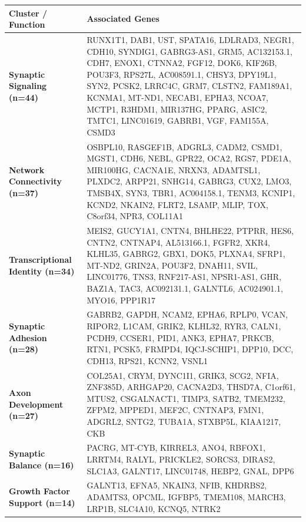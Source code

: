 \begin{longtable}{p{} p{}}
\hline
\textbf{Cluster / Function} & \textbf{Associated Genes} \\
\hline
\endhead
\textbf{Synaptic Signaling (n=44)} & RUNX1T1,  DAB1,  UST,  SPATA16,  LDLRAD3,  NEGR1,  CDH10,  SYNDIG1,  GABRG3-AS1,  GRM5,  AC132153.1,  CDH7,  ENOX1,  CTNNA2,  FGF12,  DOK6,  KIF26B,  POU3F3,  RPS27L,  AC008591.1,  CHSY3,  DPY19L1,  SYN2,  PCSK2,  LRRC4C,  GRM7,  CLSTN2,  FAM189A1,  KCNMA1,  MT-ND1,  NECAB1,  EPHA3,  NCOA7,  MCTP1,  R3HDM1,  MIR137HG,  PPARG,  ASIC2,  TMTC1,  LINC01619,  GABRB1,  VGF,  FAM155A,  CSMD3 \\
\hline
\textbf{Network Connectivity (n=37)} & OSBPL10,  RASGEF1B,  ADGRL3,  CADM2,  CSMD1,  MGST1,  CDH6,  NEBL,  GPR22,  OCA2,  RGS7,  PDE1A,  MIR100HG,  CACNA1E,  NRXN3,  ADAMTSL1,  PLXDC2,  ARPP21,  SNHG14,  GABRG3,  CUX2,  LMO3,  TMSB4X,  SYN3,  TBR1,  AC004158.1,  TENM3,  KCNIP1,  KCND2,  NKAIN2,  FLRT2,  LSAMP,  MLIP,  TOX,  C8orf34,  NPR3,  COL11A1 \\
\hline
\textbf{Transcriptional Identity (n=34)} & MEIS2,  GUCY1A1,  CNTN4,  BHLHE22,  PTPRR,  HES6,  CNTN2,  CNTNAP4,  AL513166.1,  FGFR2,  XKR4,  KLHL35,  GABRG2,  GBX1,  DOK5,  PLXNA4,  SFRP1,  MT-ND2,  GRIN2A,  POU3F2,  DNAH11,  SVIL,  LINC01776,  TNS3,  RNF217-AS1,  NPSR1-AS1,  GHR,  BAZ1A,  TAC3,  AC092131.1,  GALNTL6,  AC024901.1,  MYO16,  PPP1R17 \\
\hline
\textbf{Synaptic Adhesion (n=28)} & GABRB2,  GAPDH,  NCAM2,  EPHA6,  RPLP0,  VCAN,  RIPOR2,  L1CAM,  GRIK2,  KLHL32,  RYR3,  CALN1,  PCDH9,  CCSER1,  PID1,  ANK3,  EPHA7,  PRKCB,  RTN1,  PCSK5,  FRMPD4,  IQCJ-SCHIP1,  DPP10,  DCC,  CDH13,  RPS21,  KCNN2,  VSNL1 \\
\hline
\textbf{Axon Development (n=27)} & COL25A1,  CRYM,  DYNC1I1,  GRIK3,  SCG2,  NFIA,  ZNF385D,  ARHGAP20,  CACNA2D3,  THSD7A,  C1orf61,  MTUS2,  CSGALNACT1,  TIMP3,  SATB2,  TMEM232,  ZFPM2,  MPPED1,  MEF2C,  CNTNAP3,  FMN1,  ADGRL2,  SNTG2,  TUBA1A,  STXBP5L,  KIAA1217,  CKB \\
\hline
\textbf{Synaptic Balance (n=16)} & PACRG,  MT-CYB,  KIRREL3,  ANO4,  RBFOX1,  LRRTM4,  RALYL,  PRICKLE2,  SORCS3,  DIRAS2,  SLC1A3,  GALNT17,  LINC01748,  HEBP2,  GNAL,  DPP6 \\
\hline
\textbf{Growth Factor Support (n=14)} & GALNT13,  EFNA5,  NKAIN3,  NFIB,  KHDRBS2,  ADAMTS3,  OPCML,  IGFBP5,  TMEM108,  MARCH3,  LRP1B,  SLC4A10,  KCNQ5,  NTRK2 \\
\hline
\end{longtable}
